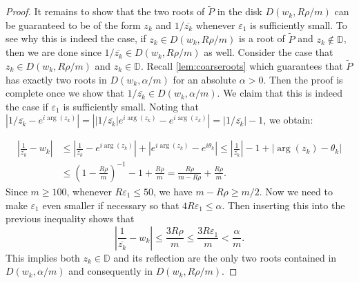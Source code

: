 \documentclass[11pt]{article}
\theoremstyle{definition}
\numberwithin{theorem}{section}
\numberwithin{equation}{section}
\def\D{\mathbb{D}}
\renewcommand{\tilde}{\widetilde}
\renewcommand{\epsilon}{\varepsilon}
\numberwithin{equation}{section}
\begin{document}
\begin{proof}

    It remains to show that the two roots of $\tilde P$ in the disk $D(w_k, R\rho /m)$ can be guaranteed to be of the form $z_k$ and $1/\overline{z_k}$ whenever $\epsilon_1$ is sufficiently small. To see why this is indeed the case, if $z_k\in D(w_k,R\rho/m)$ is a root of $\tilde P$ and $z_k\not\in \D$, then we are done since $1/\overline {z_k}\in D(w_k,R\rho/m)$ as well. Consider the case that $z_k\in D(w_k,R\rho/m)$ and $z_k\in \D$. Recall \cref{lem:coarseroots} which guarantees that $\tilde P$ has exactly two roots in $D(w_k,\alpha/m)$ for an absolute $\alpha>0$. Then the proof is complete once we show that $1/\overline{z_k}\in D(w_k,\alpha/m)$. We claim that this is indeed the case if $\epsilon_1$ is sufficiently small.
    Noting that $\left|1/\overline{z_k} - e^{i\arg(z_k)} \right| = \left|\left|1/\overline{z_k}\right| e^{i\arg(z_k)}  - e^{i\arg(z_k)} \right| = \left|1/\overline{z_k}\right| -1$, we obtain: 

    \begin{align*}
    \left|\frac1{\overline{z_k}} - w_k\right|
    &\leq \left|\frac1{\overline{z_k}} - e^{i\arg(z_k)} \right| + \left| e^{i\arg(z_k)} - e^{i\theta_k} \right|
    \leq \left|\frac1{\overline{z_k}} \right| -1 + \left|\arg(z_k)-\theta_k\right| \\
    &\leq \left(1-\frac{R\rho}m\right)^{-1}-1 + \frac{R\rho}m
    = \frac {R \rho} {m-R\rho} + \frac {R\rho}m.
    \end{align*}
    Since $m\geq 100$, whenever $R\epsilon_1\leq 50$, we have $m-R\rho \geq m/2$. Now we need to make $\epsilon_1$ even smaller if necessary so that $4R\epsilon_1\leq \alpha$. Then inserting this into the previous inequality shows that 
    $$
    \left|\frac1{\overline{z_k}} - w_k\right|
    \leq \frac{3R\rho}m 
    \leq \frac{3R\epsilon_1}m
    < \frac \alpha m. 
    $$
    This implies both $z_k \in \D$ and its reflection are the only two roots contained in $D(w_k,\alpha/m)$ and consequently in $D(w_k,R\rho/m)$. 


\end{proof}
\end{document}
